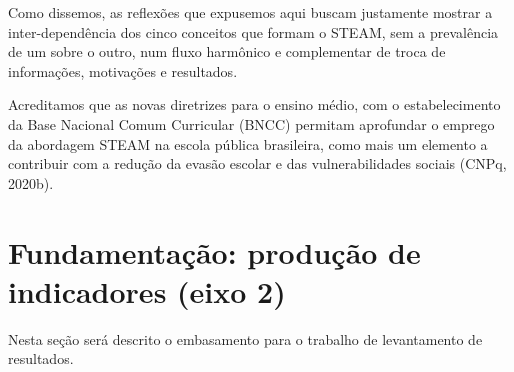 \documentclass[
12pt,		%
openright,	%
twoside,  %
a4paper,			%
chapter=TITLE,		%
english,			%
french,				%
spanish,			%
brazil				%
]{USPSC-classe/USPSC}
\begin{document}
Como dissemos, as reflex\~oes que expusemos aqui buscam justamente mostrar a inter-depend\^encia dos cinco conceitos que formam o STEAM, sem a preval\^encia de um sobre o outro, num fluxo harm\^onico e complementar de troca de informa\c{c}\~oes, motiva\c{c}\~oes e resultados.











\noindent\begin{center}\mbox{\centering{}}\end{center}


Acreditamos que as novas diretrizes para o ensino m\'edio, com o estabelecimento da Base Nacional Comum Curricular (BNCC) permitam aprofundar o emprego da abordagem STEAM na escola p\'ublica brasileira, como mais um elemento a contribuir com a redu\c{c}\~ao da evas\~ao escolar e das vulnerabilidades sociais  (CNPq, 2020b).










\section[Fundamenta\c{c}\~ao: produ\c{c}\~ao de indicadores (eixo 2)]{Fundamenta\c{c}\~ao: produ\c{c}\~ao de indicadores (eixo 2)}\label{Fundamenta\c{c}\~ao: produ\c{c}\~ao de indicadores (eixo 2)}
Nesta se\c{c}\~ao ser\'a descrito o embasamento para o trabalho de levantamento de resultados.
\end{document}
